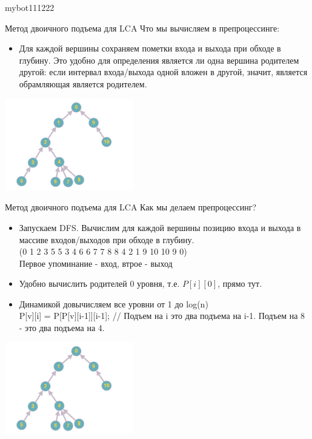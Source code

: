 mybot111222\documentclass[10pt]{beamer}
\begin{document}
\begin{frame}[fragile]{Метод двоичного подъема для LCA}
Что мы вычисляем в препроцессинге:
\begin{itemize}
    \item Для каждой вершины сохраняем пометки входа и выхода при обходе в глубину. Это удобно для определения является ли одна вершина родителем другой: если интервал входа/выхода одной вложен в другой, значит, является обрамляющая является родителем.
\end{itemize}
\begin{center}
    \includegraphics[height=4cm]{Term_2/Source/images/10-lca.png}
\end{center}
\end{frame}


\begin{frame}[fragile]{Метод двоичного подъема для LCA}
Как мы делаем препроцессинг?
\begin{itemize}
    \item Запускаем DFS. Вычислим для каждой вершины позицию входа и выхода в массиве входов/выходов при обходе в глубину. \\
(0 1 2 3 5 5 3 4 6 6 7 7 8 8 4 2 1 9 10 10 9 0) \\
Первое упоминание - вход, втрое - выход
    \item Удобно вычислить родителей 0 уровня, т.е. $P[i][0]$, прямо тут. 
    \item Динамикой довычисляем все уровни от 1 до log(n) \\
P[v][i] = P[P[v][i-1]][i-1]; // Подъем на i это два подъема на i-1. Подъем на 8 - это два подъема на 4.
\end{itemize}
\begin{center}
    \includegraphics[height=4cm]{Term_2/Source/images/10-lca.png}
\end{center}
\end{frame}
\end{document}
